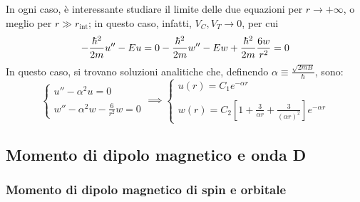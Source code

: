 \documentclass[11pt, a4paper]{scrartcl}
\theoremstyle{style}
\numberwithin{equation}{subsection}
\begin{document}
In ogni caso, \`e interessante studiare il limite delle due equazioni per $r\to +\infty$, o meglio per $r\gg r_\text{int}$; in questo caso, infatti, $V_C,V_T \to  0$, per cui 
\begin{equation*}
	\displaystyle -\frac{\hbar ^2}{2m} u'' - E u = 0 \\
	\\
	\displaystyle - \frac{\hbar ^2}{2m} w'' - Ew + \frac{\hbar ^2}{2m} \frac{6w }{r^2} = 0 
\end{equation*}
In questo caso, si trovano soluzioni analitiche che, definendo $\alpha \equiv \frac{\sqrt{2m B} }{\hbar }$, sono:
\begin{equation}
	\begin{cases}
		u'' - \alpha ^2 u = 0\\
		\\
		\displaystyle w'' - \alpha ^2 w - \frac{6}{r^2}w = 0 
	\end{cases} \implies \begin{cases}
		\displaystyle u(r) = C_1 e ^{-\alpha r}\\
		\\
		\displaystyle w(r) = C_2 \left[ 1 + \frac{3}{\alpha r} + \frac{3}{(\alpha r)^2} \right] e^{-\alpha r}
	\end{cases}
\end{equation}
\subsection{Momento di dipolo magnetico e onda D}


\subsubsection{Momento di dipolo magnetico di spin e orbitale}
\end{document}
